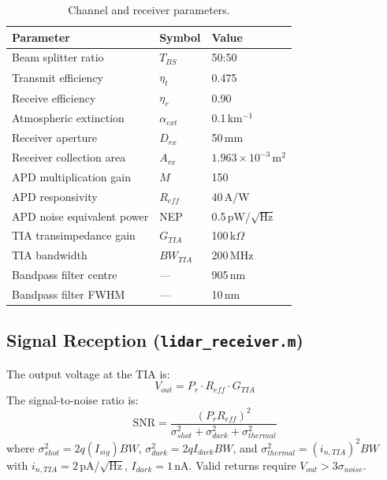 \documentclass[12pt,a4paper]{article}
\begin{document}
\begin{table}[H]
\centering
\caption{Channel and receiver parameters.}
\label{tab:channel}
\begin{tabular}{lll}
\toprule
\textbf{Parameter} & \textbf{Symbol} & \textbf{Value} \\
\midrule
Beam splitter ratio         & $T_{BS}$           & 50:50 \\
Transmit efficiency         & $\eta_t$           & 0.475 \\
Receive efficiency          & $\eta_r$           & 0.90 \\
Atmospheric extinction      & $\alpha_{ext}$     & 0.1\,km$^{-1}$ \\
Receiver aperture           & $D_{rx}$           & 50\,mm \\
Receiver collection area    & $A_{rx}$           & $1.963\times10^{-3}$\,m$^2$ \\
APD multiplication gain     & $M$                & 150 \\
APD responsivity            & $R_{eff}$          & 40\,A/W \\
APD noise equivalent power  & NEP                & 0.5\,pW/$\sqrt{\text{Hz}}$ \\
TIA transimpedance gain     & $G_{TIA}$          & 100\,k$\Omega$ \\
TIA bandwidth               & $BW_{TIA}$         & 200\,MHz \\
Bandpass filter centre      & ---                & 905\,nm \\
Bandpass filter FWHM        & ---                & 10\,nm \\
\bottomrule
\end{tabular}
\end{table}

\subsection{Signal Reception (\texttt{lidar\_receiver.m})}

The output voltage at the TIA is:
\begin{equation}
    V_{out} = P_r \cdot R_{eff} \cdot G_{TIA}
\end{equation}
The signal-to-noise ratio is:
\begin{equation}
    \mathrm{SNR} = \frac{(P_r R_{eff})^2}
                        {\sigma_{shot}^2 + \sigma_{dark}^2 + \sigma_{thermal}^2}
\end{equation}
where $\sigma_{shot}^2 = 2q(I_{sig})BW$, $\sigma_{dark}^2 = 2qI_{dark}BW$, and
$\sigma_{thermal}^2 = (i_{n,TIA})^2 BW$ with $i_{n,TIA} = 2$\,pA/$\sqrt{\text{Hz}}$,
$I_{dark} = 1$\,nA.  Valid returns require $V_{out} > 3\sigma_{noise}$.
\end{document}
